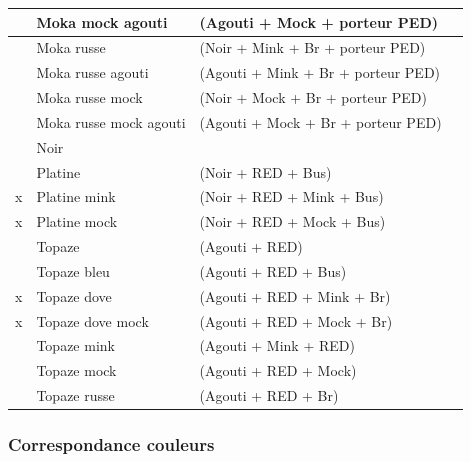 \documentclass[a4paper,10pt]{article}
\begin{document}
\begin{longtable}{|c|l|l|l|}
& Moka mock agouti  & (Agouti + Mock +   porteur PED) & \\\hline
& Moka russe  & (Noir + Mink + Br + porteur  PED) & \\\hline
& Moka russe agouti  & (Agouti + Mink + Br +  porteur PED) & \\\hline
& Moka russe mock  & (Noir + Mock + Br + porteur PED) & \\\hline
& Moka russe mock agouti  & (Agouti + Mock +  Br + porteur PED) & \\\hline
& Noir & & \\\hline
& Platine  & (Noir + RED + Bus) & \\\hline
x & Platine mink  & (Noir + RED + Mink + Bus) & \\\hline
x & Platine mock  & (Noir + RED + Mock + Bus) & \\\hline
& Topaze  & (Agouti + RED) & \\\hline
& Topaze bleu  & (Agouti + RED + Bus)  & \\\hline
x & Topaze dove  & (Agouti + RED + Mink + Br) & \\\hline
x & Topaze dove mock  & (Agouti + RED + Mock + Br) & \\\hline
& Topaze mink  & (Agouti + Mink + RED) & \\\hline
& Topaze mock  & (Agouti + RED + Mock) & \\\hline
& Topaze russe  & (Agouti + RED + Br) & \\\hline
\end{longtable}

\subsubsection{Correspondance couleurs}
\end{document}
